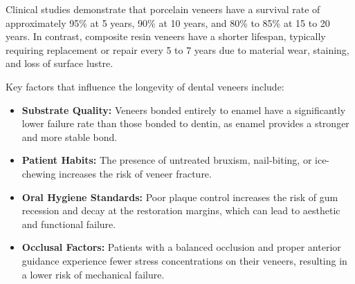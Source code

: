 Clinical studies demonstrate that porcelain veneers have a survival rate of approximately 95\% at 5 years, 90\% at 10 years, and 80\% to 85\% at 15 to 20 years. In contrast, composite resin veneers have a shorter lifespan, typically requiring replacement or repair every 5 to 7 years due to material wear, staining, and loss of surface lustre.

Key factors that influence the longevity of dental veneers include:
\begin{itemize}
    \item \textbf{Substrate Quality:} Veneers bonded entirely to enamel have a significantly lower failure rate than those bonded to dentin, as enamel provides a stronger and more stable bond.
    \item \textbf{Patient Habits:} The presence of untreated bruxism, nail-biting, or ice-chewing increases the risk of veneer fracture.
    \item \textbf{Oral Hygiene Standards:} Poor plaque control increases the risk of gum recession and decay at the restoration margins, which can lead to aesthetic and functional failure.
    \item \textbf{Occlusal Factors:} Patients with a balanced occlusion and proper anterior guidance experience fewer stress concentrations on their veneers, resulting in a lower risk of mechanical failure.
\end{itemize}

